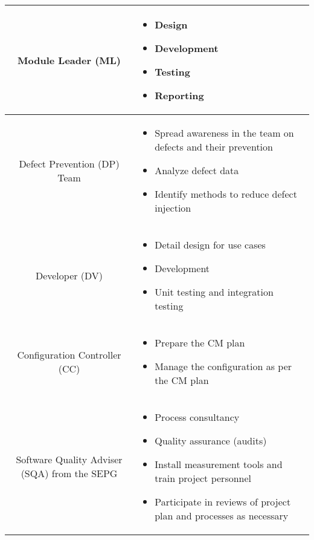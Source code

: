 \documentclass[a4paper,11pt]{article}
\begin{document}
\begin{center}
\begin{longtable}{|S|T|}
\hline Module Leader (ML) &
    \begin{itemize}
    \item Design
    \item Development
    \item Testing
    \item Reporting
    \end{itemize} \\
    
\hline Defect Prevention (DP) Team &
    \begin{itemize}
    \item Spread awareness in the team on defects and their prevention
    \item Analyze defect data
    \item Identify methods to reduce defect injection
    \end{itemize} \\
    
\hline Developer (DV) &
    \begin{itemize}
    \item Detail design for use cases
    \item Development
    \item Unit testing and integration testing
    \end{itemize} \\
    
\hline Configuration Controller (CC) &
    \begin{itemize}
    \item Prepare the CM plan
    \item Manage the configuration as per the CM plan
    \end{itemize} \\
    
\hline Software Quality Adviser (SQA) from the SEPG &
    \begin{itemize}
    \item Process consultancy
    \item Quality assurance (audits)
    \item Install measurement tools and train project personnel
    \item Participate in reviews of project plan and processes as necessary
    \end{itemize} \\
    
\hline
\end{longtable}
\end{center}
\end{document}
